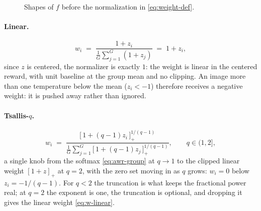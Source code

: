 \documentclass[10pt]{article} %
\begin{document}
\begin{figure}[t]
\centering
{}
\caption{Shapes of $f$ before the normalization in \eqref{eq:weight-def}.}
\label{fig:shapes}
\end{figure}

\paragraph{Linear.}
\begin{equation}\label{eq:w-linear}
w_i\;=\;\frac{1+z_i}{\frac{1}{G}\sum_{j=1}^{G}(1+z_j)}
\;=\;1+z_i,
\end{equation}
since $z$ is centered, the normalizer is exactly $1$: the weight is linear in the centered reward,
with unit baseline at the group mean and no clipping. An image more than one temperature below the
mean ($z_i<-1$) therefore receives a negative weight: it is pushed away rather than ignored.

\paragraph{Tsallis-$q$.}
\begin{equation}\label{eq:w-tsallis}
w_i\;=\;\frac{\big[\,1+(q{-}1)z_i\,\big]_+^{1/(q-1)}}{\frac{1}{G}\sum_{j=1}^{G}\big[\,1+(q{-}1)z_j\,\big]_+^{1/(q-1)}},
\qquad q\in(1,2],
\end{equation}
a single knob from the softmax \eqref{eq:awr-group} at $q\to1$ to the clipped linear
weight $[1+z]_+$ at $q=2$, with the zero set moving in as $q$ grows: $w_i=0$ below $z_i=-1/(q-1)$.
For $q<2$ the truncation is what keeps the fractional power real; at $q=2$ the exponent is one,
the truncation is optional, and dropping it gives the linear weight \eqref{eq:w-linear}.
\end{document}
